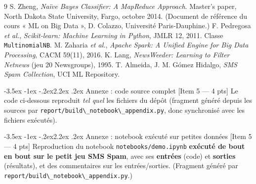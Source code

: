 \documentclass[11pt,a4paper]{article}
\makeatletter
\newcommand{\code}[1]{\lstinline[style=py]!#1!}
\renewcommand\section{\@startsection{section}{1}{\z@}%
  {-3.5ex \@plus -1ex \@minus -.2ex}{2.2ex \@plus.2ex}%
  {\normalfont\Large\bfseries\color{primary}}}
\makeatother
\begin{document}
\begin{thebibliography}{9}
 S. Zheng, \emph{Naïve Bayes Classifier: A MapReduce Approach}.
Master's paper, North Dakota State University, Fargo, octobre 2014. (Document de référence du
cours « ML on Big Data », D. Colazzo, Université Paris-Dauphine.)
 F. Pedregosa \emph{et al.}, \emph{Scikit-learn: Machine Learning in Python},
JMLR 12, 2011. Classe \texttt{MultinomialNB}.
 M. Zaharia \emph{et al.}, \emph{Apache Spark: A Unified Engine for Big Data
Processing}, CACM 59(11), 2016.
 K. Lang, \emph{NewsWeeder: Learning to Filter Netnews} (jeu 20 Newsgroups), 1995.
 T. Almeida, J. M. Gómez Hidalgo, \emph{SMS Spam Collection}, UCI ML Repository.
\end{thebibliography}

\appendix
\section{Annexe : code source complet \hfill\normalsize\textmd{[Item 5 --- 4 pts]}}
\label{sec:annexe-code}
Le code ci-dessous reproduit \emph{tel quel} les fichiers du dépôt (fragment généré depuis
les sources par \code{report/build\_notebook\_appendix.py}, donc synchronisé avec les
fichiers exécutés).



\section{Annexe : notebook exécuté sur petites données \hfill\normalsize\textmd{[Item 5 --- 4 pts]}}
\label{sec:annexe-nb}
Reproduction du notebook \code{notebooks/demo.ipynb} \textbf{exécuté de bout en bout sur le
petit jeu SMS Spam}, avec ses \textbf{entrées} (code) et \textbf{sorties} (résultats), et des
commentaires sur les entrées/sorties. (Fragment généré par
\code{report/build\_notebook\_appendix.py}.)


\end{document}
